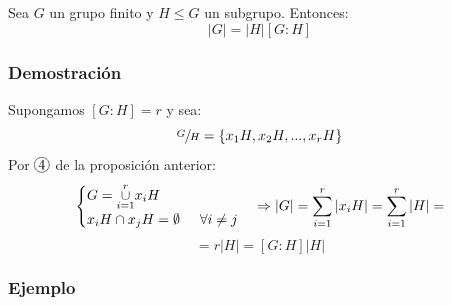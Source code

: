 \documentclass[11pt,a4paper]{article}
\newcommand*{\circled}[2][]{\tikz[baseline=(C.base)]{
	\node[inner sep=0pt] (C) {\vphantom{1g}#2};
	\node[draw, circle, inner sep=1pt, yshift=1pt]
		at (C.center) {\vphantom{1g}};}}
\begin{document}
Sea $G$ un grupo finito y $H \leqslant G$ un subgrupo. Entonces:
$$|G| = |H|[G:H]$$

\subsubsection*{Demostración}

Supongamos $[G:H] = r$ y sea:
$$\sfrac{G}{H} = \{ x_{1}H, x_{2}H, ..., x_{r}H\}$$
Por $\circled{4}$ de la proposición anterior:
\begin{equation*}
\begin{cases}
G = \overset{r}{\underset{i=1}{\cup}} x_{i} H \\
x_{i}H \cap x_{j}H = \emptyset \hspace{0.5cm} \forall i \neq j
\end{cases}
\Rightarrow |G| = \sum_{i=1}^{r} |x_{i}H| = \sum_{i=1}^{r} |H| =
\end{equation*}
$$= r|H| = [G:H] |H|$$

\subsubsection*{Ejemplo}
\end{document}
